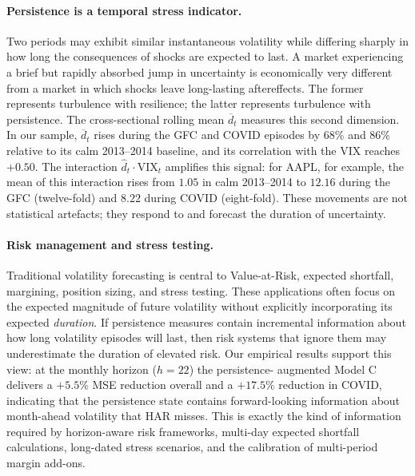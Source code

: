 \documentclass[11pt,a4paper]{article}
\newcommand{\VIX}{\mathrm{VIX}}
\newcommand{\dhat}{\hat d}
\begin{document}
\paragraph{Persistence is a temporal stress indicator.}
Two periods may exhibit similar instantaneous volatility while differing
sharply in how long the consequences of shocks are expected to last. A
market experiencing a brief but rapidly absorbed jump in uncertainty is
economically very different from a market in which shocks leave
long-lasting aftereffects. The former represents turbulence with
resilience; the latter represents turbulence with persistence. The
cross-sectional rolling mean $\overline d_t$ measures this second
dimension. In our sample, $\overline d_t$ rises during the GFC and COVID
episodes by 68\% and 86\% relative to its calm 2013--2014 baseline, and
its correlation with the VIX reaches $+0.50$. The interaction
$\dhat_t\!\cdot\!\VIX_t$ amplifies this signal: for AAPL, for example,
the mean of this interaction rises from $1.05$ in calm 2013--2014 to
$12.16$ during the GFC (twelve-fold) and $8.22$ during COVID
(eight-fold). These movements are not statistical artefacts; they
respond to and forecast the duration of uncertainty.

\paragraph{Risk management and stress testing.}
Traditional volatility forecasting is central to Value-at-Risk, expected
shortfall, margining, position sizing, and stress testing. These
applications often focus on the expected magnitude of future volatility
without explicitly incorporating its expected \emph{duration}. If
persistence measures contain incremental information about how long
volatility episodes will last, then risk systems that ignore them may
underestimate the duration of elevated risk. Our empirical results
support this view: at the monthly horizon ($h=22$) the persistence-
augmented Model C delivers a $+5.5\%$ MSE reduction overall and a
$+17.5\%$ reduction in COVID, indicating that the persistence state
contains forward-looking information about month-ahead volatility that
HAR misses. This is exactly the kind of information required by horizon-aware risk frameworks, multi-day expected shortfall calculations, long-dated stress scenarios, and the calibration of multi-period margin add-ons.
\end{document}
